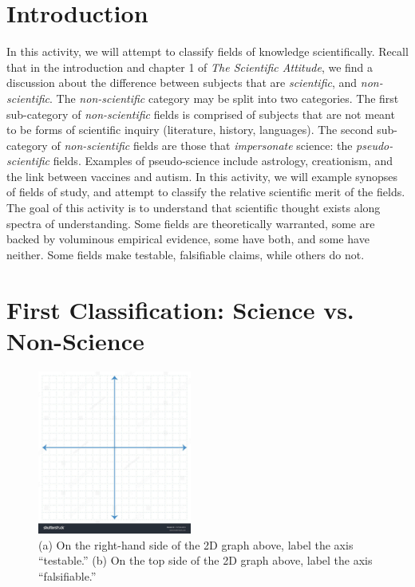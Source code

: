 \documentclass[12pt]{article}
\begin{document}
\maketitle

\section{Introduction}

In this activity, we will attempt to classify fields of knowledge scientifically.  Recall that in the introduction and chapter 1 of \textit{The Scientific Attitude}, we find a discussion about the difference between subjects that are \textit{scientific}, and \textit{non-scientific}.  The \textit{non-scientific} category may be split into two categories.  The first sub-category of \textit{non-scientific} fields is comprised of subjects that are not meant to be forms of scientific inquiry (literature, history, languages).  The second sub-category of \textit{non-scientific} fields are those that \textit{impersonate} science: the \textit{pseudo-scientific} fields.  Examples of pseudo-science include astrology, creationism, and the link between vaccines and autism.  In this activity, we will example synopses of fields of study, and attempt to classify the relative scientific merit of the fields.  The goal of this activity is to understand that scientific thought exists along spectra of understanding.  Some fields are theoretically warranted, some are backed by voluminous empirical evidence, some have both, and some have neither.  Some fields make testable, falsifiable claims, while others do not.

\section{First Classification: Science vs. Non-Science}

\begin{figure}[ht]
\centering
\includegraphics[width=0.45\textwidth,trim=0cm 3.5cm 0cm 0cm,clip=true]{figures/graph.jpg}
\caption{\label{fig:1} (a) On the right-hand side of the 2D graph above, label the axis ``testable.''  (b) On the top side of the 2D graph above, label the axis ``falsifiable.''}
\end{figure}
\end{document}
